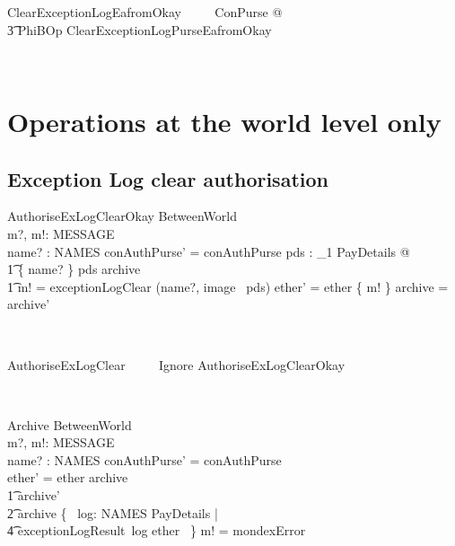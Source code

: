 \begin{LSDef}
\begin{zed}
  ClearExceptionLogEafromOkay ~~~~ \exists \Delta ConPurse @
  \\ \t3                        PhiBOp \land ClearExceptionLogPurseEafromOkay
\end{zed}~\end{LSDef}

\section{Operations at the world level only}\label{ch5.worldop}

\subsection{Exception Log clear authorisation}

\begin{LSDef}
\begin{schema}{AuthoriseExLogClearOkay}
  \Delta BetweenWorld
  \\    m?, m!: MESSAGE
  \\    name? : NAMES
  \where
  conAuthPurse' = conAuthPurse
  \also
  \exists pds : \power_1 PayDetails @
  \\ \t1                \{ name? \} \cross pds \subseteq archive
  \\ \t1                \land m! = exceptionLogClear (name?, image~ pds)
  \also
  ether' = ether \cup \{ m! \}
  \also
  archive = archive'
\end{schema}~\end{LSDef}

\begin{LSDef}
\begin{zed}
  AuthoriseExLogClear ~~~~ Ignore \lor AuthoriseExLogClearOkay
\end{zed}~\end{LSDef}

\begin{LSDef}
\begin{schema}{Archive}
  \Delta BetweenWorld
  \\    m?, m!: MESSAGE
  \\    name? : NAMES
  \where
  conAuthPurse' = conAuthPurse
  \\    ether' = ether
  \also
  archive \subseteq
  \\ \t1                archive' \subseteq
  \\ \t2                archive \cup \{~ log: NAMES \cross PayDetails |
  \\ \t4                                exceptionLogResult~log \in ether ~\}
  \also
  m! = mondexError
\end{schema}~\end{LSDef}

